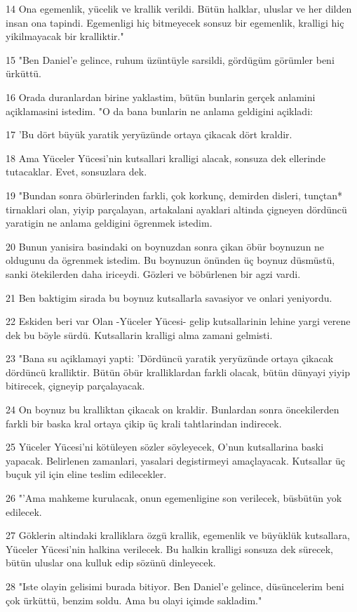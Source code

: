\par 14 Ona egemenlik, yücelik ve krallik verildi. Bütün halklar, uluslar ve her dilden insan ona tapindi. Egemenligi hiç bitmeyecek sonsuz bir egemenlik, kralligi hiç yikilmayacak bir kralliktir."
\par 15 "Ben Daniel'e gelince, ruhum üzüntüyle sarsildi, gördügüm görümler beni ürküttü.
\par 16 Orada duranlardan birine yaklastim, bütün bunlarin gerçek anlamini açiklamasini istedim. "O da bana bunlarin ne anlama geldigini açikladi:
\par 17 'Bu dört büyük yaratik yeryüzünde ortaya çikacak dört kraldir.
\par 18 Ama Yüceler Yücesi'nin kutsallari kralligi alacak, sonsuza dek ellerinde tutacaklar. Evet, sonsuzlara dek.
\par 19 "Bundan sonra öbürlerinden farkli, çok korkunç, demirden disleri, tunçtan* tirnaklari olan, yiyip parçalayan, artakalani ayaklari altinda çigneyen dördüncü yaratigin ne anlama geldigini ögrenmek istedim.
\par 20 Bunun yanisira basindaki on boynuzdan sonra çikan öbür boynuzun ne oldugunu da ögrenmek istedim. Bu boynuzun önünden üç boynuz düsmüstü, sanki ötekilerden daha iriceydi. Gözleri ve böbürlenen bir agzi vardi.
\par 21 Ben baktigim sirada bu boynuz kutsallarla savasiyor ve onlari yeniyordu.
\par 22 Eskiden beri var Olan -Yüceler Yücesi- gelip kutsallarinin lehine yargi verene dek bu böyle sürdü. Kutsallarin kralligi alma zamani gelmisti.
\par 23 "Bana su açiklamayi yapti: 'Dördüncü yaratik yeryüzünde ortaya çikacak dördüncü kralliktir. Bütün öbür kralliklardan farkli olacak, bütün dünyayi yiyip bitirecek, çigneyip parçalayacak.
\par 24 On boynuz bu kralliktan çikacak on kraldir. Bunlardan sonra öncekilerden farkli bir baska kral ortaya çikip üç krali tahtlarindan indirecek.
\par 25 Yüceler Yücesi'ni kötüleyen sözler söyleyecek, O'nun kutsallarina baski yapacak. Belirlenen zamanlari, yasalari degistirmeyi amaçlayacak. Kutsallar üç buçuk yil için eline teslim edilecekler.
\par 26 "'Ama mahkeme kurulacak, onun egemenligine son verilecek, büsbütün yok edilecek.
\par 27 Göklerin altindaki kralliklara özgü krallik, egemenlik ve büyüklük kutsallara, Yüceler Yücesi'nin halkina verilecek. Bu halkin kralligi sonsuza dek sürecek, bütün uluslar ona kulluk edip sözünü dinleyecek.
\par 28 "Iste olayin gelisimi burada bitiyor. Ben Daniel'e gelince, düsüncelerim beni çok ürküttü, benzim soldu. Ama bu olayi içimde sakladim."

